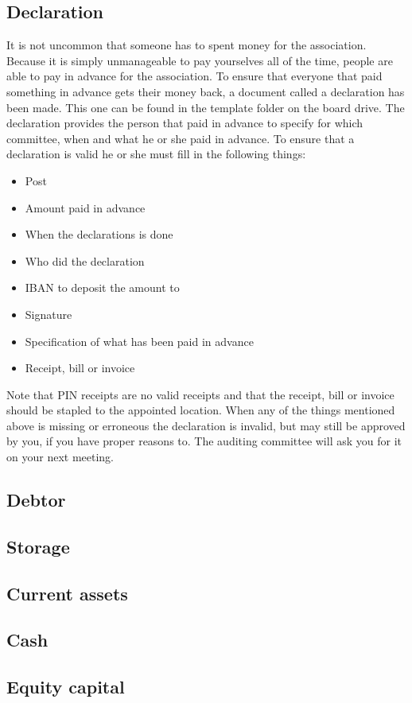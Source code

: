 \documentclass{report}
\begin{document}
\subsection{Declaration}
It is not uncommon that someone has to spent money for the association. Because it is simply unmanageable to pay yourselves all of the time, people are able to pay in advance for the association. To ensure that everyone that paid something in advance gets their money back, a document called a declaration has been made. This one can be found in the template folder on the board drive. The declaration provides the person that paid in advance to specify for which committee, when and what he or she paid in advance. To ensure that a declaration is valid he or she must fill in the following things:
\begin{itemize}
\item Post
\item Amount paid in advance
\item When the declarations is done
\item Who did the declaration
\item IBAN to deposit the amount to
\item Signature
\item Specification of what has been paid in advance
\item Receipt, bill or invoice
\end{itemize}
Note that PIN receipts are no valid receipts and that the receipt, bill or invoice should be stapled to the appointed location. When any of the things mentioned above is missing or erroneous the declaration is invalid, but may still be approved by you, if you have proper reasons to. The auditing committee will ask you for it on your next meeting.  
   
\subsection{Debtor}
\subsection{Storage}
\subsection{Current assets}
\subsection{Cash}
\subsection{Equity capital}
\end{document}
